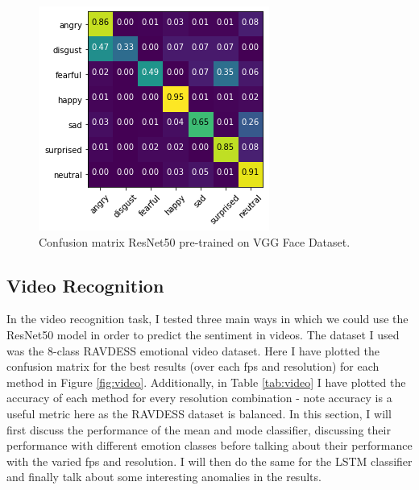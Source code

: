\documentclass[sigconf]{acmart}
\begin{document}
{\begin{figure}[htbp]
	\includegraphics[width=0.7\linewidth]{images/image-vgg.png}
	\caption{Confusion matrix ResNet50 pre-trained on VGG Face Dataset.}
  \label{fig:image-vgg}
\end{figure}





\subsection{Video Recognition}

In the video recognition task, I tested three main ways in which we could use
the ResNet50 model in order to predict the sentiment in videos. The dataset I
used was the 8-class RAVDESS emotional video dataset. Here I have plotted the
confusion matrix for the best results (over each fps and resolution) for 
each method in Figure \ref{fig:video}. Additionally, in Table \ref{tab:video}
I have plotted the accuracy of each method for every resolution combination -
note accuracy is a useful metric here as the RAVDESS dataset is balanced. In
this section, I will first discuss the performance of the mean and mode
classifier, discussing their performance with different emotion classes before
talking about their performance with the varied fps and resolution. I will
then do the same for the LSTM classifier and finally talk about some
interesting anomalies in the results.

}
\end{document}
